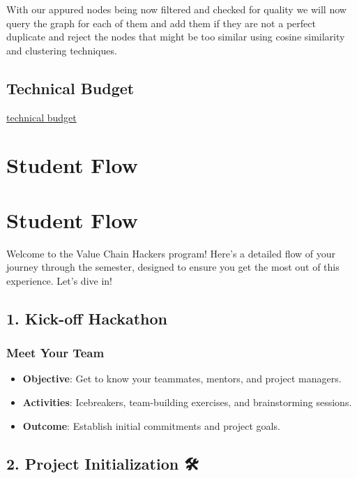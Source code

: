 \documentclass[
  letterpaper,
  DIV=11,
  numbers=noendperiod]{scrreprt}
\providecommand{\tightlist}{%
  \setlength{\itemsep}{0pt}\setlength{\parskip}{0pt}}\usepackage{longtable,booktabs,array}
\begin{document}
With our appured nodes being now filtered and checked for quality we
will now query the graph for each of them and add them if they are not a
perfect duplicate and reject the nodes that might be too similar using
cosine similarity and clustering techniques.

\section{Technical Budget}\label{technical-budget}

\href{./technicalbudget.qmd}{technical budget}


\chapter{Student Flow}\label{student-flow}


\chapter{Student Flow}\label{student-flow-1}

Welcome to the Value Chain Hackers program! Here's a detailed flow of
your journey through the semester, designed to ensure you get the most
out of this experience. Let's dive in! 🌊

\section{1. Kick-off Hackathon 🚀}\label{kick-off-hackathon}

\subsection{Meet Your Team 🤝}\label{meet-your-team}

\begin{itemize}
\tightlist
\item
  \textbf{Objective}: Get to know your teammates, mentors, and project
  managers.
\item
  \textbf{Activities}: Icebreakers, team-building exercises, and
  brainstorming sessions.
\item
  \textbf{Outcome}: Establish initial commitments and project goals.
\end{itemize}

\section{2. Project Initialization 🛠️}\label{project-initialization}
\end{document}
